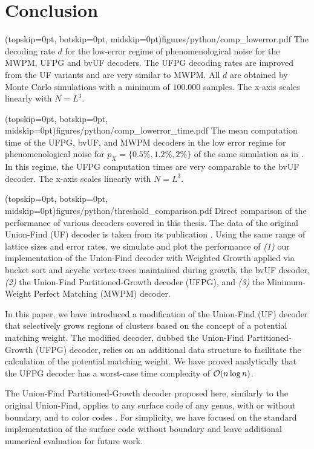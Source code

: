 \section{Conclusion}\label{sec:conclusion}

\Figure[b!](topskip=0pt, botskip=0pt, midskip=0pt){figures/python/comp_lowerror.pdf}{
  The decoding rate $d$ for the low-error regime of phenomenological noise for the MWPM, UFPG and bvUF decoders. The UFPG decoding rates are improved from the UF variants and are very similar to MWPM. All $d$ are obtained by Monte Carlo simulations with a minimum of $100.000$ samples. The x-axis scales linearly with $N = L^3$.\label{comp_lowerror}}

\Figure[b!](topskip=0pt, botskip=0pt, midskip=0pt){figures/python/comp_lowerror_time.pdf}{
  The mean computation time of the UFPG, bvUF, and MWPM decoders in the low error regime for phenomenological noise for $p_X = \{0.5\%, 1.2\%, 2\%\}$ of the same simulation as in . In this regime, the UFPG computation times are very comparable to the bvUF decoder. The x-axis scales linearly with $N = L^3$. \label{comp_lowerror_time}}

\Figure[t](topskip=0pt, botskip=0pt, midskip=0pt){figures/python/threshold_comparison.pdf}{
  Direct comparison of the performance of various decoders covered in this thesis. The data of the original Union-Find (UF) decoder is taken from its publication \cite{delfosse2017almost}. Using the same range of lattice sizes and error rates, we simulate and plot the performance of \emph{(1)} our implementation of the Union-Find decoder with Weighted Growth applied via bucket sort and acyclic vertex-trees maintained during growth, the bvUF decoder, \emph{(2)} the Union-Find Partitioned-Growth decoder (UFPG), and  \emph{(3)} the Minimum-Weight Perfect Matching (MWPM) decoder.\label{thres_comp}}

In this paper, we have introduced a modification of the Union-Find (UF) decoder \cite{delfosse2017almost} that selectively grows regions of clusters based on the concept of a potential matching weight. The modified decoder, dubbed the Union-Find Partitioned-Growth (UFPG) decoder, relies on an additional data structure to facilitate the calculation of the potential matching weight. We have proved analytically that the UFPG decoder has a worst-case time complexity of $\mathcal{O}(n\log{n})$. 

The Union-Find Partitioned-Growth decoder proposed here, similarly to the original Union-Find, applies to any surface code of any genus, with or without boundary, and to color codes \cite{delfosse2017almost}. For simplicity, we have focused on the standard implementation of the surface code without boundary and leave additional numerical evaluation for future work.

